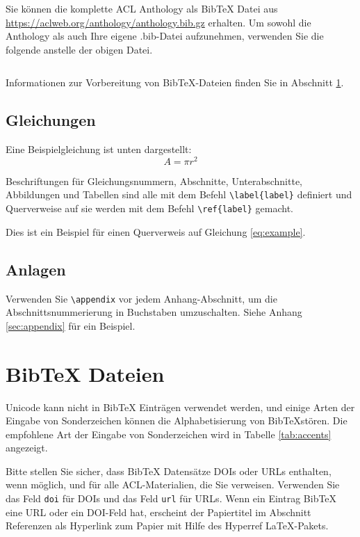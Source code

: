 \documentclass[11pt]{article}
\begin{document}
Sie können die komplette ACL Anthology als Bib\TeX{} Datei aus \url{https://aclweb.org/anthology/anthology.bib.gz} erhalten. Um sowohl die Anthology als auch Ihre eigene .bib-Datei aufzunehmen, verwenden Sie die folgende anstelle der obigen Datei.
\begin{quote}
\begin{verbatim}

\end{verbatim}
\end{quote}

Informationen zur Vorbereitung von Bib\TeX{}-Dateien finden Sie in Abschnitt \ref{sec:bibtex}.

\subsection{Gleichungen}

Eine Beispielgleichung ist unten dargestellt: \begin{equation}
  \label{eq:example}
  A = \pi r^2
\end{equation}

Beschriftungen für Gleichungsnummern, Abschnitte, Unterabschnitte, Abbildungen und Tabellen sind alle mit dem Befehl \verb|\label{label}| definiert und Querverweise auf sie werden mit dem Befehl \verb|\ref{label}| gemacht.

Dies ist ein Beispiel für einen Querverweis auf Gleichung \ref{eq:example}.

\subsection{Anlagen}

Verwenden Sie \verb|\appendix| vor jedem Anhang-Abschnitt, um die Abschnittsnummerierung in Buchstaben umzuschalten. Siehe Anhang \ref{sec:appendix} für ein Beispiel.

\section{Bib\TeX{} Dateien}
\label{sec:bibtex}

Unicode kann nicht in Bib\TeX{} Einträgen verwendet werden, und einige Arten der Eingabe von Sonderzeichen können die Alphabetisierung von Bib\TeX stören. Die empfohlene Art der Eingabe von Sonderzeichen wird in Tabelle \ref{tab:accents} angezeigt.

Bitte stellen Sie sicher, dass Bib\TeX{} Datensätze DOIs oder URLs enthalten, wenn möglich, und für alle ACL-Materialien, die Sie verweisen. Verwenden Sie das Feld \verb|doi| für DOIs und das Feld \verb|url| für URLs. Wenn ein Eintrag Bib\TeX{} eine URL oder ein DOI-Feld hat, erscheint der Papiertitel im Abschnitt Referenzen als Hyperlink zum Papier mit Hilfe des Hyperref \LaTeX{}-Pakets.
\end{document}
